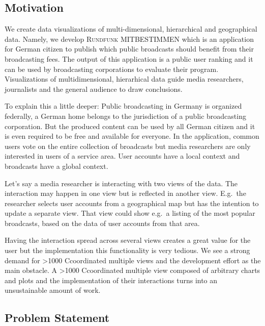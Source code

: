 \documentclass{article}
\newcommand{\rufu}{\textsc{Rundfunk MITBESTIMMEN}}
\newcommand\hmm[1]{\ifnum\ifhmode\spacefactor\else2000\fi>1000 \uppercase{#1}\else#1\fi}
\newcommand{\cmv}{\hmm{c}oordinated multiple view}
\newcommand{\cmvs}{\hmm{c}oordinated multiple views}
\newcommand{\tmaps}{\textsc{2.5D} tree maps}
\begin{document}

\subsection{Motivation}\label{sec:outline}

We create data visualizations of multi-dimensional, hierarchical and geographical data.
Namely, we develop \rufu{} which is an application for German citizen to publish which public broadcasts should benefit from their broadcasting fees.
The output of this application is a public user ranking and it can be used by broadcasting corporations to evaluate their program.
Visualizations of multidimensional, hierarhical data guide media researchers, journalists and the general audience to draw conclusions.

To explain this a little deeper:
Public broadcasting in Germany is organized federally, a German home belongs to the jurisdiction of a public broadcasting corporation.
But the produced content can be used by all German citizen and it is even required to be free and available for everyone.
In the application, common users vote on the entire collection of broadcasts but media researchers are only interested in users of a service area.
User accounts have a local context and broadcasts have a global context.

Let's say a media researcher is interacting with two views of the data.
The interaction may happen in one view but is reflected in another view.
E.g.\ the researcher selects user accounts from a geographical map but has the intention to update a separate view.
That view could show e.g.\ a listing of the most popular broadcasts, based on the data of user accounts from that area.

Having the interaction spread across several views creates a great value for the user but the implementation this functionality is very tedious.
We see a strong demand for \cmvs{} and the development effort as the main obstacle.
A \cmv{} composed of arbitrary charts and plots and the implementation of their interactions turns into an unsustainable amount of work.

\subsection{Problem Statement}
%
\end{document}
